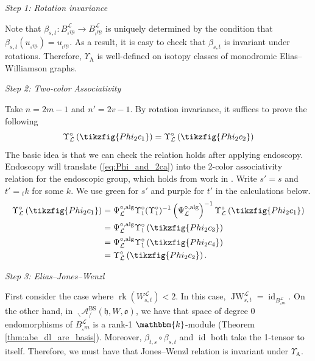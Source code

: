 \documentclass{amsart}
\renewcommand{\k}{\mathbbm{k}}
\newcommand{\scrL}{\mathcal{L}}
\DeclareMathOperator{\id}{id}
\DeclareMathOperator{\rk}{rk}
\newcommand{\fr}[1]{\mathfrak{#1}}
\DeclareMathOperator{\alg}{alg}
\DeclareMathOperator{\Abe}{A}
\DeclareMathOperator{\BS}{BS}
\DeclareMathOperator{\JW}{JW}
\newcommand{\Amon}[2]{\:_{#1 \backslash} \mathcal{A}_{/ #2} }
\theoremstyle{definition}
\numberwithin{equation}{subsection}
\begin{document}
\noindent\emph{Step 1: Rotation invariance}

Note that $\beta_{s,t} : B_{{}_s \underline{m}}^{\scrL} \to B_{{}_t \underline{m}}^{\scrL}$ is uniquely determined by the condition that $\beta_{s,t} (u_{{}_s \underline{m}}) = u_{{}_t \underline{m}}$.
As a result,  it is easy to check that $\beta_{s,t}$ is invariant under rotations. Therefore, $\Upsilon_{\Abe}$ is well-defined on isotopy classes of monodromic Elias--Williamson graphs.
 
\noindent\emph{Step 2: Two-color Associativity}

Take $n = 2m-1$ and $n' = 2v-1$.
By rotation invariance, it suffices to prove the following
\begin{equation}\label{eq:Phi_and_2ca}
    \Upsilon_{\scrL}^{\circ} \left( \tikzfig{Phi_2c_1} \right) = \Upsilon_{\scrL}^{\circ} \left( \tikzfig{Phi_2c_2} \right)
\end{equation}
The basic idea is that we can check the relation holds after applying endoscopy. Endoscopy will translate (\ref{eq:Phi_and_2ca}) into the 2-color associativity relation for the endoscopic group, which holds from work in \cite{Elib}.
Write $s' = s$ and $t' = {}_t k$ for some $k$. We use green for $s'$ and purple for $t'$ in the calculations below.
\begin{align*}
    \Upsilon_{\scrL}^{\circ} \left( \tikzfig{Phi_2c_1} \right) &=  \Psi_{\scrL}^{\circ, \alg} \Upsilon_1^{\circ} (\Upsilon_1^{\circ})^{-1}  \left(\Psi_{\scrL}^{\circ, \alg}\right)^{-1} \Upsilon_{\scrL}^{\circ} \left( \tikzfig{Phi_2c_1} \right) \\
    &= \Psi_{\scrL}^{\circ, \alg} \Upsilon_1^{\circ} \left( \tikzfig{Phi_2c_3}\right) \\
    &= \Psi_{\scrL}^{\circ, \alg} \Upsilon_1^{\circ} \left( \tikzfig{Phi_2c_4}\right) \\
    &= \Upsilon_{\scrL}^{\circ} \left( \tikzfig{Phi_2c_2} \right).
\end{align*}

\noindent\emph{Step 3: Elias--Jones--Wenzl}

First consider the case where $\rk (W_{s,t}^{\scrL}) < 2$.
In this case, $\JW_{s,t}^{\scrL} = \id_{B_{{}_s m}^{\scrL}}$.
On the other hand, in $\Amon{}{}^{\BS} (\fr{h}, W, \fr{o})$, we have that space of degree 0 endomorphisms of $B_{{}_s m}^{\scrL}$ is a rank-1 $\k$-module (Theorem \ref{thm:abe_dl_are_basis}).
Moreover, $\beta_{t,s} \circ \beta_{s,t}$ and $\id$ both take the 1-tensor to itself. Therefore, we must have that Jones--Wenzl relation is invariant under $\Upsilon_{\Abe}$. 
\end{document}
